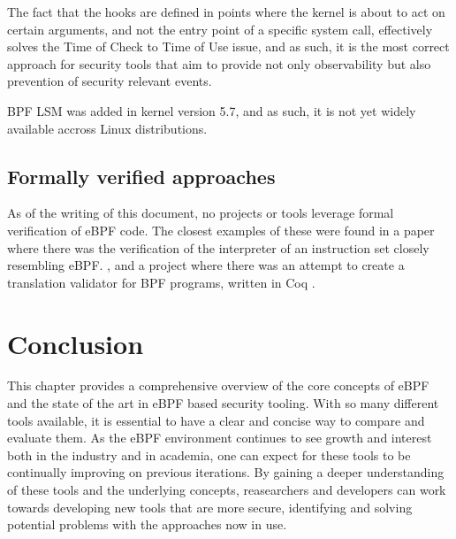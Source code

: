 The fact that the hooks are defined in points where the kernel is about to act on certain arguments, and not the entry point of a specific system call, effectively solves the Time of Check to Time of Use issue, and as such, it is the most correct approach for security tools that aim to provide not only observability but also prevention of security relevant events. 

BPF LSM was added in kernel version 5.7, and as such, it is not yet widely available accross Linux distributions.


\subsection{Formally verified approaches}

As of the writing of this document, no projects or tools leverage formal verification of eBPF code. The closest examples of these were found in a paper where there was the verification of the interpreter of an instruction set closely resembling eBPF. \cite{bpfverif}, and a project where there was an attempt to create a translation validator for BPF programs, written in Coq \cite{bpfproof}. 


\section{Conclusion}
This chapter provides a comprehensive overview of the core concepts of eBPF and the state of the art in eBPF based security tooling. With so many different tools available, it is essential to have a clear and concise way to compare and evaluate them. As the eBPF environment continues to see growth and interest both in the industry and in academia, one can expect for these tools to be continually improving on previous iterations. By gaining a deeper understanding of these tools and the underlying concepts, reasearchers and developers can work towards developing new tools that are more secure, identifying and solving potential problems with the approaches now in use. 
